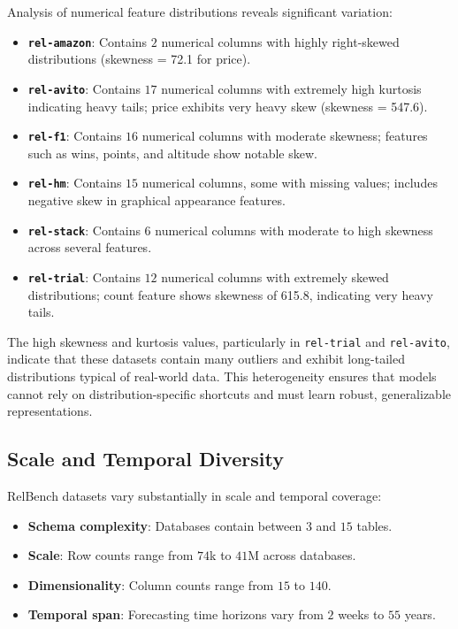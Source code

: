 Analysis of numerical feature distributions reveals significant variation:
\begin{itemize}
\item \textbf{\texttt{rel-amazon}}: Contains $2$ numerical columns with highly right-skewed distributions (skewness = 72.1 for price).
\item \textbf{\texttt{rel-avito}}: Contains $17$ numerical columns with extremely high kurtosis indicating heavy tails; price exhibits very heavy skew (skewness = 547.6).
\item \textbf{\texttt{rel-f1}}: Contains $16$ numerical columns with moderate skewness; features such as wins, points, and altitude show notable skew.
\item \textbf{\texttt{rel-hm}}: Contains $15$ numerical columns, some with missing values; includes negative skew in graphical appearance features.
\item \textbf{\texttt{rel-stack}}: Contains $6$ numerical columns with moderate to high skewness across several features.
\item \textbf{\texttt{rel-trial}}: Contains $12$ numerical columns with extremely skewed distributions; count feature shows skewness of 615.8, indicating very heavy tails.
\end{itemize}



The high skewness and kurtosis values, particularly in \texttt{rel-trial} and \texttt{rel-avito}, indicate that these datasets contain many outliers and exhibit long-tailed distributions typical of real-world data. This heterogeneity ensures that models cannot rely on distribution-specific shortcuts and must learn robust, generalizable representations.

\subsection{Scale and Temporal Diversity}

RelBench datasets vary substantially in scale and temporal coverage:
\begin{itemize}
\item \textbf{Schema complexity}: Databases contain between $3$ and $15$ tables.
\item \textbf{Scale}: Row counts range from $74$k to $41$M across databases.
\item \textbf{Dimensionality}: Column counts range from $15$ to $140$.
\item \textbf{Temporal span}: Forecasting time horizons vary from $2$ weeks to $55$ years.
\end{itemize}

